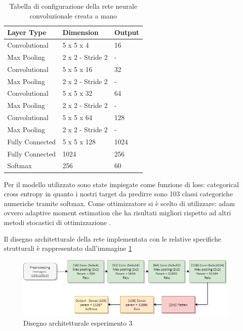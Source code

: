 \begin{table}
    \centering
    \begin{tabular}{|l|l|l|}
    \hline
    \textbf{Layer Type} & \textbf{Dimension} & \textbf{Output} \\ \hline
    Convolutional   & 5 x 5 x 4         & 16     \\ \hline
    Max Pooling     & 2 x 2 - Stride 2  & -      \\ \hline
    Convolutional   & 5 x 5 x 16        & 32     \\ \hline
    Max Pooling     & 2 x 2 - Stride 2  & -      \\ \hline
    Convolutional   & 5 x 5 x 32        & 64     \\ \hline
    Max Pooling     & 2 x 2 - Stride 2  & -      \\ \hline
    Convolutional   & 5 x 5 x 64        & 128    \\ \hline
    Max Pooling     & 2 x 2 - Stride 2  & -      \\ \hline
    Fully Connected & 5 x 5 x 128       & 1024   \\ \hline
    Fully Connected & 1024              & 256    \\ \hline
    Softmax         & 256               & 60     \\ \hline
    \end{tabular}
    \caption{\label{tab:esperimento3_configurazione}Tabella di configurazione della rete neurale convoluzionale creata a mano}
\end{table}

Per il modello utilizzato sono state impiegate come funzione di loss: categorical cross entropy in quanto i nostri target da predirre sono 103 classi categoriche numeriche tramite softmax. Come ottimizzatore si è scelto di utilizzare: adam ovvero adaptive moment estimation che ha risultati migliori rispetto ad altri metodi stocastici di ottimizzazione \cite{adam}.

Il disegno architetturale della rete implementata con le relative specifiche strutturali è rappresentato dall'immagine \ref{fig:architettura-esperimento3}
\begin{figure}
    \centering
    \includegraphics[width=1\textwidth]{./resources/AdvanceMachineLearningSchema-Esperimento3.png}
    \caption{Disegno architetturale esperimento 3} 
    \label{fig:architettura-esperimento3}
\end{figure}




